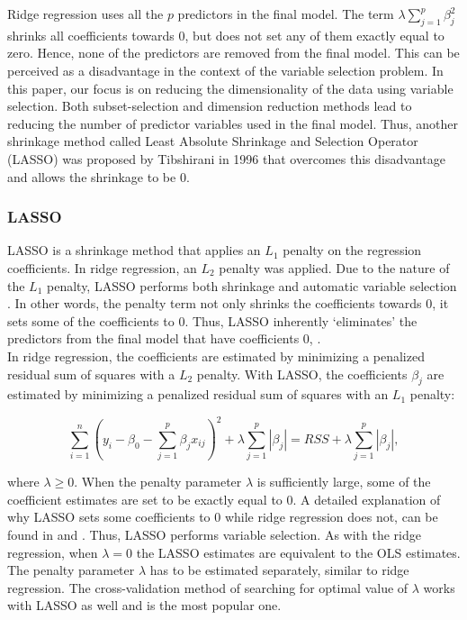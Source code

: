 Ridge regression uses all the $p$ predictors in the final model. The term $\lambda\sum_{j = 1}^p \beta_j^2$ shrinks all coefficients towards 0, but does not set any of them exactly equal to zero. Hence, none of the predictors are removed from the final model. This can be perceived as a disadvantage in the context of the variable selection problem. In this paper, our focus is on reducing the dimensionality of the data using variable selection. Both subset-selection and dimension reduction methods lead to reducing the number of predictor variables used in the final model. Thus, another shrinkage method called Least Absolute Shrinkage and Selection Operator (LASSO) was proposed by  Tibshirani in 1996 \cite{tibshirani1996} that overcomes this disadvantage and allows the shrinkage to be 0. \\ 

\subsubsection{LASSO}

LASSO is a shrinkage method that applies an $L_1$ penalty on the regression coefficients. In ridge regression, an $L_2$ penalty was applied. Due to the nature of the $L_1$ penalty, LASSO performs both shrinkage and automatic variable selection \cite{tibshirani1996}. In other words, the penalty term not only shrinks the coefficients towards 0, it sets some of the coefficients to 0. Thus, LASSO inherently `eliminates' the predictors from the final model that have coefficients 0, . \\

In ridge regression, the coefficients are estimated by minimizing a penalized residual sum of squares with a $L_2$ penalty. With LASSO, the coefficients $\beta_j$ are estimated by minimizing a penalized residual sum of squares with an $L_1$ penalty:

\begin{equation}
\sum_{i = 1}^n \left( y_i - \beta_0 - \sum_{j = 1}^p \beta_j x_{ij} \right)^2 + \lambda \sum_{j = 1}^p | \beta_j | = RSS +  \lambda \sum_{j = 1}^p | \beta_j | ,
\end{equation}

\noindent where $\lambda \geq 0$. When the penalty parameter $\lambda$ is sufficiently large, some of the coefficient estimates are set to be exactly equal to 0. A detailed explanation of why LASSO sets some coefficients to 0 while ridge regression does not, can be found in \cite{tibshirani1996} and \cite{james_introduction_2013}. Thus, LASSO performs variable selection. As with the ridge regression, when $\lambda  = 0 $ the LASSO estimates are equivalent to the OLS estimates. The penalty parameter $\lambda$ has to be estimated separately, similar to ridge regression. The cross-validation method of searching for optimal value of $\lambda$ works with LASSO as well and is the most popular one. \\

